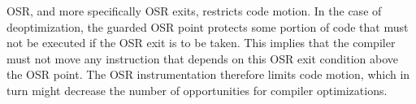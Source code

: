 OSR, and more specifically OSR exits, restricts code motion. 
In the case of deoptimization, the guarded OSR point protects some portion of code that must not be executed if the OSR exit is to be taken.
This implies that the compiler must not move any instruction that depends on this OSR exit condition above the OSR point.
The OSR instrumentation therefore limits code motion, which in turn might decrease the number of opportunities for compiler optimizations.